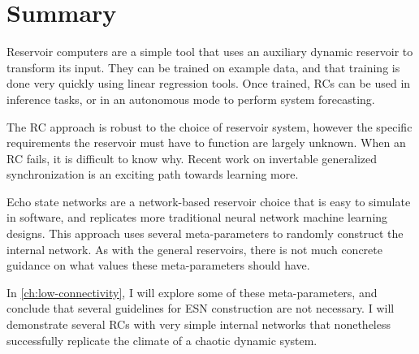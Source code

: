 \section{Summary}

Reservoir computers are a simple tool that uses an auxiliary dynamic
reservoir to transform its input. They can be trained on example data,
and that training is done very quickly using linear regression
tools. Once trained, RCs can be used in inference tasks, or in an
autonomous mode to perform system forecasting.

The RC approach is robust to the choice of reservoir system, however
the specific requirements the reservoir must have to function are
largely unknown. When an RC fails, it is difficult to know why. Recent
work on invertable generalized synchronization is an exciting path
towards learning more.

Echo state networks are a network-based reservoir choice that is easy
to simulate in software, and replicates more traditional neural
network machine learning designs. This approach uses several
meta-parameters to randomly construct the internal network. As with the
general reservoirs, there is not much concrete guidance on what values
these meta-parameters should have.

In \cref{ch:low-connectivity}, I will explore some of these
meta-parameters, and conclude that several guidelines for ESN
construction are not necessary. I will demonstrate several RCs with
very simple internal networks that nonetheless successfully replicate
the climate of a chaotic dynamic system.

